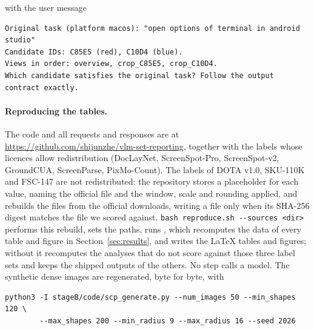 \noindent with the user message

{\footnotesize
\begin{verbatim}
Original task (platform macos): "open options of terminal in android studio"
Candidate IDs: C85E5 (red), C10D4 (blue).
Views in order: overview, crop_C85E5, crop_C10D4.
Which candidate satisfies the original task? Follow the output contract exactly.
\end{verbatim}
}

\paragraph{Reproducing the tables.} The code and all requests and responses are at \url{https://github.com/shijunzhe/vlm-set-reporting}, together with the labels whose licences allow redistribution (DocLayNet, ScreenSpot-Pro, ScreenSpot-v2, GroundCUA, ScreenParse, PixMo-Count). The labels of DOTA v1.0, SKU-110K and FSC-147 are not redistributed: the repository stores a placeholder for each value, naming the official file and the window, scale and rounding applied, and  rebuilds the files from the official downloads, writing a file only when its SHA-256 digest matches the file we scored against. \verb|bash reproduce.sh --sources <dir>| performs this rebuild, sets the paths, runs , which recomputes the data of every table and figure in Section~\ref{sec:results}, and writes the LaTeX tables and figures; without  it recomputes the analyses that do not score against those three label sets and keeps the shipped outputs of the others. No step calls a model. The synthetic dense images are regenerated, byte for byte, with
{\small
\begin{verbatim}
python3 -I stageB/code/scp_generate.py --num_images 50 --min_shapes 120 \
        --max_shapes 200 --min_radius 9 --max_radius 16 --seed 2026
\end{verbatim}
}
